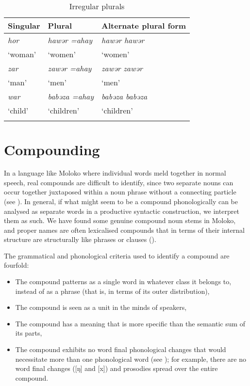 \begin{table}
\begin{tabular}{lll}
\lsptoprule
{Singular} & {Plural} & {Alternate plural form}\\
\midrule
\textit{hor} & \textit{hawər =ahay} & \textit{hawər hawər} \\
 ‘woman’ & ‘women’  & ‘women’\\\midrule
\textit{zar}  & \textit{zawər =ahay} & \textit{zawər zawər} \\
‘man’ &  ‘men’  & ‘men’\\\midrule
\textit{war} & \textit{babəza =ahay} & \textit{babəza babəza} \\
 ‘child’ & ‘children’  & ‘children’\\
\lspbottomrule
\end{tabular}
\caption{Irregular plurals}\label{tab:31}
\end{table}
\section{Compounding}\label{sec:4.3}
\hypertarget{RefHeading1211521525720847}{}
In a language like Moloko where individual words meld together in normal speech, real compounds are difficult to identify, since two separate nouns can occur together juxtaposed within a noun phrase without a connecting particle (see ). In general, if what might seem to be a compound phonologically can be analysed as separate words in a productive syntactic construction, we interpret them as such. We have found some genuine compound noun stems in Moloko, and proper names are often lexicalised compounds that in terms of their internal structure are structurally like phrases or clauses (). 

The grammatical and phonological criteria used to identify a compound are fourfold:
\largerpage
\begin{itemize}
\item The compound patterns as a single word in whatever class it belongs to, instead of as a phrase (that is, in terms of its outer distribution),
\item    The compound is seen as a unit in the minds of speakers,
\item The compound has a meaning that is more specific than the semantic sum of its parts,
\item The compound exhibits no word final phonological changes that would necessitate more than one phonological word (see ); for example, there are no word final changes ([ŋ] and [x]) and prosodies spread over the entire compound.
\end{itemize}

